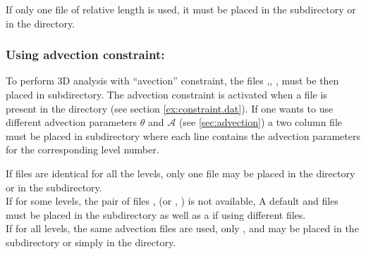 If only one  file of relative length is used, it must be placed in  the  subdirectory or in the  directory.

\begin{center}
\end{center}


\subsubsection{ Using advection constraint:}


To perform 3D analysis with  ``avection''  constraint, the files ,\linebreak {}, ,  must be then placed in  subdirectory. The advection constraint is activated when a  file is present in the  directory (see section \ref{ex:constraint.dat}). If one wants to use different advection parameters $\theta$ and $\mathcal{A}$ (see \ref{sec:advection}) a two column  file must be placed in  subdirectory where each line contains the advection parameters for the corresponding level number.

If  files are identical for all the levels, only one file  may be placed in the  directory or in the  subdirectory.\\
 If for some levels, the pair of files ,  (or , ) is not available, A default  and  files must be placed in the  subdirectory as well as a  if using different  files.\\
 If for all levels, the same advection files are used, only  ,  and  may be placed in the  subdirectory or simply in the  directory.


